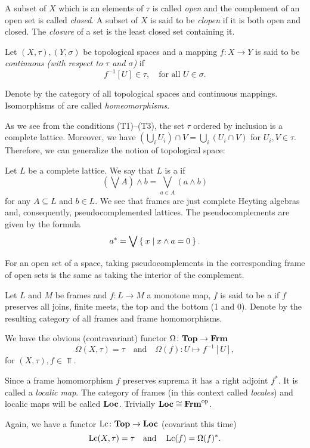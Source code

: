 A subset of $X$ which is an elements of $\tau$ is called \emph{open} and the complement of an open set is called \emph{closed}. A subset of $X$ is said to be \emph{clopen} if it is both open and closed.
The \emph{closure} of a set is the least closed set containing it.

Let $(X,\tau), (Y,\sigma)$ be topological spaces and a mapping $f\colon X\to Y$ is said to be \emph{continuous (with respect to $\tau$ and $\sigma$)} if
$$ f^{-1}[U] \in \tau,\quad\text{for all } U\in \sigma.$$

\noindent Denote by \Top{} the category of all topological spaces and continuous mappings. Isomorphisms of \Top{} are called \emph{homeomorphisms}.

As we see from the conditions (T1)--(T3), the set $\tau$ ordered by inclusion is a complete lattice. Moreover, we have $(\bigcup_i U_i)\cap V = \bigcup_i (U_i\cap V)$ for $U_i, V\in \tau$.
Therefore, we can generalize the notion of topological space:

Let $L$ be a complete lattice. We say that $L$ is a  if
$$ (\bigvee A)\wedge b = \bigvee_{a\in A} ( a\wedge b ) $$
for any $A\subseteq L$ and $b\in L$. We see that frames are just complete Heyting algebras and, consequently, pseudocomplemented lattices.
The pseudocomplements are given by the formula
$$ a^* = \bigvee \Set{ x | x\wedge a = 0}. $$

\noindent For an open set of a space, taking pseudocomplements in the corresponding frame of open sets is the same as taking the interior of the complement.

Let $L$ and $M$ be frames and $f\colon L\to M$ a monotone map, $f$ is said to be a  if $f$ preserves all joins, finite meets, the top and the bottom (1 and 0).
Denote by \Frm{} the resulting category of all frames and frame homomorphisms.

We have the obvious (contravariant) functor $\Omega\colon \mathbf{Top}\to \mathbf{Frm}$
$$ \Omega(X,\tau) = \tau\quad\text{and}\quad \Omega(f)\colon U\mapsto f^{-1}[U],$$
for $(X,\tau), f \in \Top$.

Since a frame homomorphism $f$ preserves suprema it has a right adjoint $f^*$. It is called a \emph{localic map}.
The category of frames (in this context called \emph{locales}) and localic maps will be called $\mathbf{Loc}$. Trivially $\mathbf{Loc}\cong\mathbf{Frm}^{\text{op}}$.

Again, we have a functor $\operatorname{Lc}\colon \mathbf{Top}\to \mathbf{Loc}$ (covariant this time)
$$ \operatorname{Lc}(X,\tau) = \tau\quad\text{and}\quad \operatorname{Lc}(f) = \Omega(f)^*.$$


